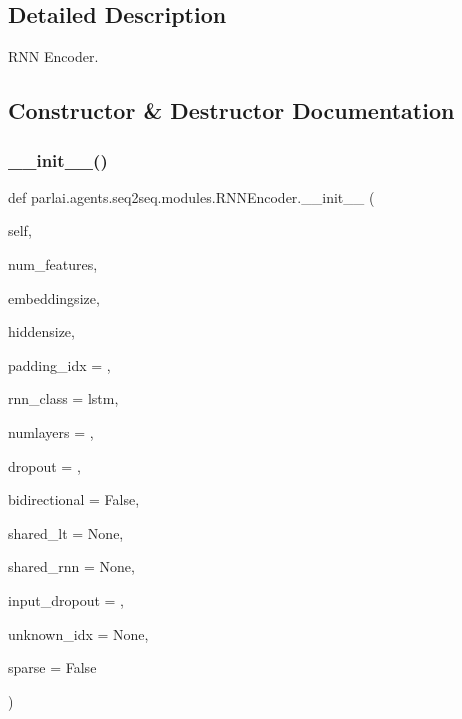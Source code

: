 \subsection{Detailed Description}
\begin{DoxyVerb}RNN Encoder.
\end{DoxyVerb}
 

\subsection{Constructor \& Destructor Documentation}
\mbox{\label{classparlai_1_1agents_1_1seq2seq_1_1modules_1_1RNNEncoder_a16b286b0c62255fe349789ea576afdb0}} 
\subsubsection{\texorpdfstring{\+\_\+\+\_\+init\+\_\+\+\_\+()}{\_\_init\_\_()}}
{\footnotesize\ttfamily def parlai.\+agents.\+seq2seq.\+modules.\+R\+N\+N\+Encoder.\+\_\+\+\_\+init\+\_\+\+\_\+ (\begin{DoxyParamCaption}\item[{}]{self,  }\item[{}]{num\+\_\+features,  }\item[{}]{embeddingsize,  }\item[{}]{hiddensize,  }\item[{}]{padding\+\_\+idx = {},  }\item[{}]{rnn\+\_\+class = {\ttfamily \textquotesingle{}lstm\textquotesingle{}},  }\item[{}]{numlayers = {},  }\item[{}]{dropout = {},  }\item[{}]{bidirectional = {\ttfamily False},  }\item[{}]{shared\+\_\+lt = {\ttfamily None},  }\item[{}]{shared\+\_\+rnn = {\ttfamily None},  }\item[{}]{input\+\_\+dropout = {},  }\item[{}]{unknown\+\_\+idx = {\ttfamily None},  }\item[{}]{sparse = {\ttfamily False} }\end{DoxyParamCaption})}

